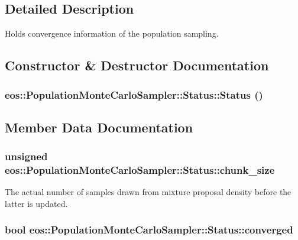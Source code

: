 \subsection{Detailed Description}
Holds convergence information of the population sampling. 

\subsection{Constructor \& Destructor Documentation}
\hypertarget{structeos_1_1PopulationMonteCarloSampler_1_1Status_a8f69a829df5ad6a829a737c4eb9c368c}{
\subsubsection[{Status}]{\setlength{\rightskip}{0pt plus 5cm}eos::PopulationMonteCarloSampler::Status::Status ()}}
\label{structeos_1_1PopulationMonteCarloSampler_1_1Status_a8f69a829df5ad6a829a737c4eb9c368c}


\subsection{Member Data Documentation}
\hypertarget{structeos_1_1PopulationMonteCarloSampler_1_1Status_aec7820c1ca91f2af381c1bb81182fa26}{
\subsubsection[{chunk\_\-size}]{\setlength{\rightskip}{0pt plus 5cm}unsigned {\bf eos::PopulationMonteCarloSampler::Status::chunk\_\-size}}}
\label{structeos_1_1PopulationMonteCarloSampler_1_1Status_aec7820c1ca91f2af381c1bb81182fa26}
The actual number of samples drawn from mixture proposal density before the latter is updated. \hypertarget{structeos_1_1PopulationMonteCarloSampler_1_1Status_a853d94d0b2fc16ee51f6e32ca4b0515c}{
\subsubsection[{converged}]{\setlength{\rightskip}{0pt plus 5cm}bool {\bf eos::PopulationMonteCarloSampler::Status::converged}}}
\label{structeos_1_1PopulationMonteCarloSampler_1_1Status_a853d94d0b2fc16ee51f6e32ca4b0515c}


